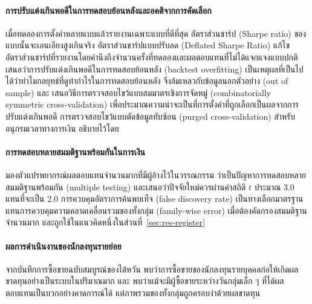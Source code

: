 \documentclass[11pt,a4paper]{article}
\newcommand{\tw}[1]{\texorpdfstring{\hspace{0pt}\mbox{#1}\hspace{0pt}}{#1}}
\begin{document}
\paragraph{การปรับแต่งเกินพอดีในการทดสอบย้อนหลังและอคติจากการคัดเลือก}
เมื่อทดลองการตั้งค่าหลายแบบแล้วรายงานเฉพาะแบบที่ดีที่สุด อัตราส่วน\tw{ชาร์ป} (Sharpe ratio)
ของแบบนั้นจะเอนเอียงสูงเกินจริง อัตราส่วน\tw{ชาร์ป}แบบปรับลด (Deflated Sharpe Ratio)
แก้ไขอัตราส่วน\tw{ชาร์ป}ที่รายงานโดยคำนึงถึงจำนวนครั้งที่ทดลองและผลตอบแทนที่ไม่ได้แจกแจงแบบปกติ
\citep{bailey2014dsr} \citet{bailey2014pseudo} เสนอว่าการปรับแต่งเกินพอดีในการทดสอบย้อนหลัง
(backtest overfitting) เป็นเหตุผลที่เป็นไปได้ว่าทำไมกลยุทธ์ที่ดูทำกำไรในการทดสอบย้อนหลัง
จึงล้มเหลวกับข้อมูลนอกตัวอย่าง (out of sample) และ \citet{bailey2017pbo}
เสนอวิธีการ\tw{ตรวจสอบ}ไขว้แบบสมมาตรเชิงการจัดหมู่ (combinatorially symmetric cross-validation)
เพื่อประมาณ\tw{ความน่าจะเป็น}ที่การตั้งค่าที่ถูกเลือกเป็นผลจากการปรับแต่งเกินพอดี
การ\tw{ตรวจสอบ}ไขว้แบบตัดข้อมูล\tw{ทับซ้อน} (purged cross-validation) สำหรับอนุกรมเวลาทางการเงิน
อธิบายไว้โดย \citet{lopezdeprado2018afml}

\paragraph{การทดสอบหลายสมมติฐานพร้อมกันในการเงิน}
\citet{harvey2016cross} มองตัวแปรพยากรณ์ผลตอบแทนจำนวนมากที่มีผู้อ้างไว้ในวรรณกรรม
ว่าเป็นปัญหาการทดสอบหลายสมมติฐานพร้อมกัน (multiple testing) และเสนอว่าปัจจัยใหม่ควรผ่านค่าสถิติ
$t$ ประมาณ 3.0 แทนที่จะเป็น 2.0 การควบคุมอัตราการ\tw{ค้นพบ}เท็จ (false discovery rate)
\citep{benjamini1995fdr} เป็นทางเลือกมาตรฐานแทนการควบคุมความ\tw{คลาดเคลื่อน}รวมของทั้งกลุ่ม
(family-wise error) เมื่อต้องคัดกรองสมมติฐานจำนวนมาก
และถูกใช้ในแนวคิดหนึ่งใน\tw{ส่วนที่}~\ref{sec:res-register}

\paragraph{ผลการดำเนินงานของนักลงทุน\tw{รายย่อย}}
จากบันทึกการ\tw{ซื้อขาย}ฉบับสมบูรณ์ของไต้หวัน \citet{barber2009lose}
พบว่าการ\tw{ซื้อขาย}ของนักลงทุนรายบุคคลก่อให้เกิดผลขาดทุนอย่างเป็นระบบในปริมาณมาก และ
\citet{barber2014daytrading} พบว่าแม้จะมีผู้\tw{ซื้อขาย}ระหว่างวันกลุ่มเล็ก ๆ
ที่ได้ผลตอบแทนเป็นบวกอย่างคาดการณ์ได้ แต่\tw{ภาพรวม}ของทั้งกลุ่มถูกครอบงำด้วยผลขาดทุน
\end{document}
